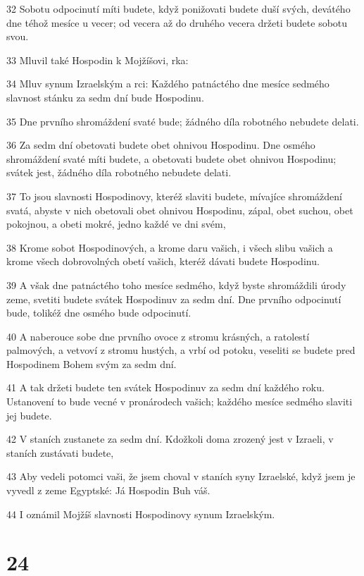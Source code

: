 \par 32 Sobotu odpocinutí míti budete, když ponižovati budete duší svých, devátého dne téhož mesíce u vecer; od vecera až do druhého vecera držeti budete sobotu svou.
\par 33 Mluvil také Hospodin k Mojžíšovi, rka:
\par 34 Mluv synum Izraelským a rci: Každého patnáctého dne mesíce sedmého slavnost stánku za sedm dní bude Hospodinu.
\par 35 Dne prvního shromáždení svaté bude; žádného díla robotného nebudete delati.
\par 36 Za sedm dní obetovati budete obet ohnivou Hospodinu. Dne osmého shromáždení svaté míti budete, a obetovati budete obet ohnivou Hospodinu; svátek jest, žádného díla robotného nebudete delati.
\par 37 To jsou slavnosti Hospodinovy, kteréž slaviti budete, mívajíce shromáždení svatá, abyste v nich obetovali obet ohnivou Hospodinu, zápal, obet suchou, obet pokojnou, a obeti mokré, jedno každé ve dni svém,
\par 38 Krome sobot Hospodinových, a krome daru vašich, i všech slibu vašich a krome všech dobrovolných obetí vašich, kteréž dávati budete Hospodinu.
\par 39 A však dne patnáctého toho mesíce sedmého, když byste shromáždili úrody zeme, svetiti budete svátek Hospodinuv za sedm dní. Dne prvního odpocinutí bude, tolikéž dne osmého bude odpocinutí.
\par 40 A naberouce sobe dne prvního ovoce z stromu krásných, a ratolestí palmových, a vetvoví z stromu hustých, a vrbí od potoku, veseliti se budete pred Hospodinem Bohem svým za sedm dní.
\par 41 A tak držeti budete ten svátek Hospodinuv za sedm dní každého roku. Ustanovení to bude vecné v pronárodech vašich; každého mesíce sedmého slaviti jej budete.
\par 42 V staních zustanete za sedm dní. Kdožkoli doma zrozený jest v Izraeli, v staních zustávati budete,
\par 43 Aby vedeli potomci vaši, že jsem choval v staních syny Izraelské, když jsem je vyvedl z zeme Egyptské: Já Hospodin Buh váš.
\par 44 I oznámil Mojžíš slavnosti Hospodinovy synum Izraelským.

\chapter{24}

